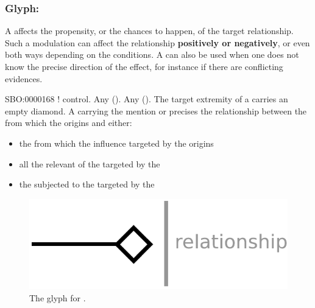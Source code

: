 \subsubsection{Glyph: }\label{sec:modulation}

A  affects the propensity, or the chances to happen, of the target relationship. Such a modulation can affect the relationship \textbf{positively or negatively}, or even both ways depending on the conditions. A  can also be used when one does not know the precise direction of the effect, for instance if there are conflicting evidences.

\begin{glyphDescription}
 \glyphSboTerm SBO:0000168 ! control.
 \glyphOrigin Any  ().
 \glyphTarget Any  ().
 \glyphEndPoint The target extremity of a  carries an empty diamond.
 \glyphAux A  carrying the mention  or  precises the relationship between the  from which the  origins and either:
\begin{itemize}
\item the  from which the influence targeted by the  origins
\item all the relevant  of the  targeted by the 
\item the  subjected to the  targeted by the 
\end{itemize}
 \end{glyphDescription}

\begin{figure}[H]
  \centering
  \includegraphics[scale = 0.5]{images/modulation}
  \caption{The \ER glyph for .}
  \label{fig:modulation}
\end{figure}
 


